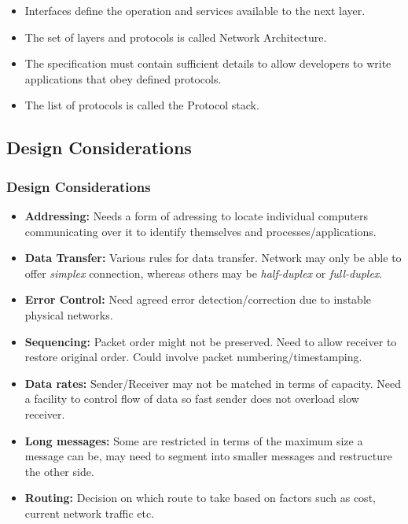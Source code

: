 \documentclass{beamer}
\begin{document}
\begin{frame}[allowframebreaks]
\begin{itemize}
\item Interfaces define the operation and services available to the next layer.
\item The set of layers and protocols is called {\color{magenta} Network Architecture}.
\item The specification must contain sufficient details to allow developers to write applications that obey defined protocols.
\item The list of protocols is called the {\color{blue} Protocol stack}.
\end{itemize}
\end{frame}
\subsection{Design Considerations}
\begin{frame}
\frametitle{Design Considerations}
\small
\begin{itemize}
\item \textbf{Addressing:} Needs a form of adressing to locate individual computers communicating over it to identify themselves and processes/applications.
\item \textbf{Data Transfer:} Various rules for data transfer. Network may only be able to offer \textit{simplex} connection, whereas others may be \textit{half-duplex} or \textit{full-duplex}.
\item \textbf{Error Control:} Need agreed error detection/correction due to instable physical networks.
\item \textbf{Sequencing:} Packet order might not be preserved. Need to allow receiver to restore original order. Could involve packet numbering/timestamping.
\item \textbf{Data rates:} Sender/Receiver may not be matched in terms of capacity. Need a facility to control flow of data so fast sender does not overload slow receiver.
\item \textbf{Long messages:} Some are restricted in terms of the maximum size a message can be, may need to segment into smaller messages and restructure the other side.
\item \textbf{Routing:} Decision on which route to take based on factors such as cost, current network traffic etc.
\end{itemize}
\end{frame}
\end{document}
